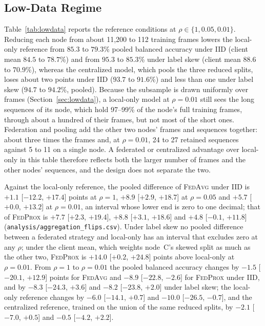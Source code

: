 \documentclass[journal]{IEEEtran}
\newcommand{\fedavg}{\textsc{FedAvg}}
\newcommand{\fedprox}{\textsc{FedProx}}
\begin{document}
\subsection{Low-Data Regime}
\label{sec:res_lowdata}

Table~\ref{tab:lowdata} reports the reference conditions at $\rho \in \{1, 0.05, 0.01\}$. Reducing each node from about 11{,}200 to 112 training frames lowers the local-only reference from $85.3$ to $79.3$\% pooled balanced accuracy under IID (client mean $84.5$ to $78.7$\%) and from $95.3$ to $85.3$\% under label skew (client mean $88.6$ to $70.9$\%), whereas the centralized model, which pools the three reduced splits, loses about two points under IID ($93.7$ to $91.6$\%) and less than one under label skew ($94.7$ to $94.2$\%, pooled). Because the subsample is drawn uniformly over frames (Section~\ref{sec:lowdata}), a local-only model at $\rho = 0.01$ still sees the long sequences of its node, which hold 97--99\% of the node's full training frames, through about a hundred of their frames, but not most of the short ones. Federation and pooling add the other two nodes' frames and sequences together: about three times the frames and, at $\rho = 0.01$, 24 to 27 retained sequences against 5 to 11 on a single node. A federated or centralized advantage over local-only in this table therefore reflects both the larger number of frames and the other nodes' sequences, and the design does not separate the two.

Against the local-only reference, the pooled difference of \fedavg{} under IID is $+1.1$ [$-12.2$, $+17.4$] points at $\rho=1$, $+8.9$ [$+2.9$, $+18.7$] at $\rho=0.05$ and $+5.7$ [$+0.0$, $+13.2$] at $\rho=0.01$, an interval whose lower end is zero to one decimal; that of \fedprox{} is $+7.7$ [$+2.3$, $+19.4$], $+8.8$ [$+3.1$, $+18.6$] and $+4.8$ [$-0.1$, $+11.8$] (\texttt{analysis/aggregation\_flips.csv}). Under label skew no pooled difference between a federated strategy and local-only has an interval that excludes zero at any $\rho$; under the client mean, which weights node~C's skewed split as much as the other two, \fedprox{} is $+14.0$ [$+0.2$, $+24.8$] points above local-only at $\rho=0.01$. From $\rho=1$ to $\rho=0.01$ the pooled balanced accuracy changes by $-1.5$ [$-20.1$, $+12.9$] points for \fedavg{} and $-8.9$ [$-22.8$, $-2.6$] for \fedprox{} under IID, and by $-8.3$ [$-24.3$, $+3.6$] and $-8.2$ [$-23.8$, $+2.0$] under label skew; the local-only reference changes by $-6.0$ [$-14.1$, $+0.7$] and $-10.0$ [$-26.5$, $-0.7$], and the centralized reference, trained on the union of the same reduced splits, by $-2.1$ [$-7.0$, $+0.5$] and $-0.5$ [$-4.2$, $+2.2$].
\end{document}
